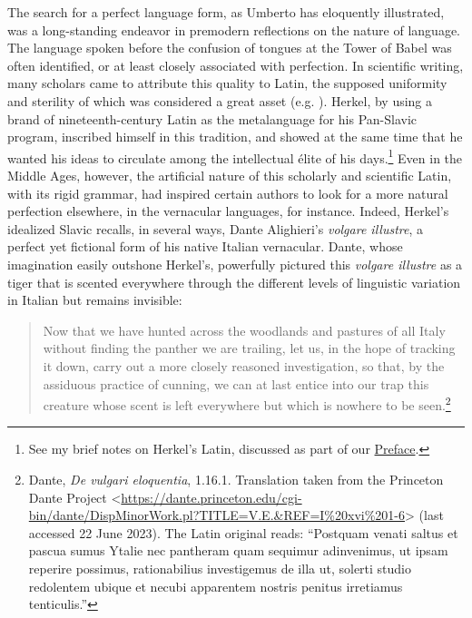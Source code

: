 The search for a perfect language form, as Umberto \citet{eco_search_1995} has eloquently illustrated, was a long-standing endeavor in premodern reflections on the nature of language. The language spoken before the confusion of tongues at the Tower of Babel was often identified, or at least closely associated with perfection. In scientific writing, many scholars came to attribute this quality to Latin, the supposed uniformity and sterility of which was considered a great asset (e.g. \cite{stroh_latein_2013}). Herkel, by using a brand of nineteenth-century Latin as the metalanguage for his Pan-Slavic program, inscribed himself in this tradition, and showed at the same time that he wanted his ideas to circulate among the intellectual élite of his days.\footnote{See my brief notes on Herkel’s Latin, discussed as part of our \hyperref[sec:Preface Latin discussion]{Preface}.} Even in the Middle Ages, however, the artificial nature of this scholarly and scientific Latin, with its rigid grammar, had inspired certain authors to look for a more natural perfection elsewhere, in the vernacular languages, for instance. Indeed, Herkel’s idealized Slavic recalls, in several ways, Dante Alighieri’s \textit{volgare illustre}, a perfect yet fictional form of his native Italian vernacular. Dante, whose imagination easily outshone Herkel’s, powerfully pictured this \textit{volgare illustre} as a tiger that is scented everywhere through the different levels of linguistic variation in Italian but remains invisible:

\begin{quote}
    Now that we have hunted across the woodlands and pastures of all Italy without finding the panther we are trailing, let us, in the hope of tracking it down, carry out a more closely reasoned investigation, so that, by the assiduous practice of cunning, we can at last entice into our trap this creature whose scent is left everywhere but which is nowhere to be seen.\footnote{Dante, \textit{De vulgari eloquentia}, 1.16.1. Translation taken from the Princeton Dante Project <\url{https://dante.princeton.edu/cgi-bin/dante/DispMinorWork.pl?TITLE=V.E.\&REF=I\%20xvi\%201-6}> (last accessed 22 June 2023). The Latin original reads: “Postquam venati saltus et pascua sumus Ytalie nec pantheram quam sequimur adinvenimus, ut ipsam reperire possimus, rationabilius investigemus de illa ut, solerti studio redolentem ubique et necubi apparentem nostris penitus irretiamus tenticulis.”}
\end{quote}

